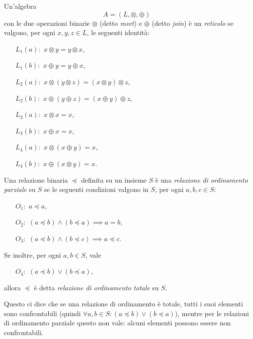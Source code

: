 \begin{definizione} 
\label{def:reticolo1}
Un'algebra
\[
    A = (L, \otimes, \oplus)
\]
con le due operazioni binarie $\otimes$ (detto \emph{meet}) e $\oplus$ (detto
\emph{join}) \`e un \emph{reticolo} se valgono, per ogni $x, y, z \in L$,
le seguenti identit\`a:
\begin{itemize}
\item[$L_1 (a):$] $x \otimes y = y \otimes x$,
\item[$L_1 (b):$] $x \oplus  y = y \oplus  x$,
\item[$L_2 (a):$] $x \otimes (y \otimes z) = (x \otimes y) \otimes z$,
\item[$L_2 (b):$] $x \oplus  (y \oplus  z) = (x \oplus  y) \oplus  z$,
\item[$L_3 (a):$] $x \otimes x = x$,
\item[$L_3 (b):$] $x \oplus  x = x$,
\item[$L_4 (a):$] $x \otimes (x \oplus  y) = x$,
\item[$L_4 (b):$] $x \oplus  (x \otimes y) = x$.
\end{itemize}
\end{definizione}

\begin{definizione}  
Una relazione binaria $\preceq$ definita su un insieme
$S$ \`e una \emph{relazione di ordinamento parziale} su $S$
se le seguenti condizioni valgono in $S$,
per ogni $a, b, c \in S$:
\begin{itemize}
\item[$O_1:$] $a \preceq a$,
\item[$O_2:$] $(a \preceq b) \land (b \preceq a) \implies a = b$,
\item[$O_3:$] $(a \preceq b) \land (b \preceq c) \implies a \preceq c$.
\end{itemize}
Se inoltre, per ogni $a, b \in S$, vale
\begin{itemize}
\item[$O_4:$] $(a \preceq b) \lor (b \preceq a)$,
\end{itemize}
allora $\preceq$ \`e detta \emph{relazione di ordinamento totale} su $S$.

Questo ci dice che se una relazione di ordinamento è totale, tutti i suoi elementi sono confrontabili (quindi $\forall a,b \in S: (a \preceq b) \lor (b \preceq a)$), mentre per le relazioni di ordinamento parziale questo non vale: alcuni elementi possono essere non confrontabili.
\end{definizione}

